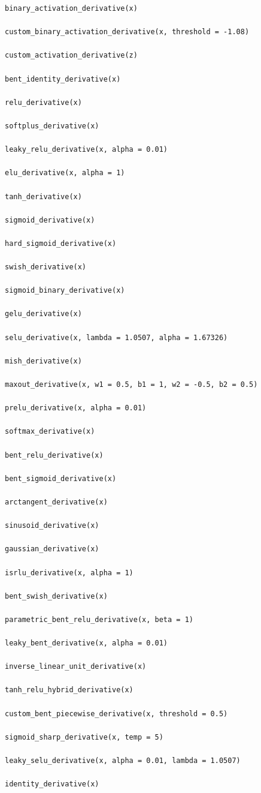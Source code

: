 \documentclass[a4paper]{book}
\begin{document}
%
\begin{Usage}
\begin{verbatim}
binary_activation_derivative(x)

custom_binary_activation_derivative(x, threshold = -1.08)

custom_activation_derivative(z)

bent_identity_derivative(x)

relu_derivative(x)

softplus_derivative(x)

leaky_relu_derivative(x, alpha = 0.01)

elu_derivative(x, alpha = 1)

tanh_derivative(x)

sigmoid_derivative(x)

hard_sigmoid_derivative(x)

swish_derivative(x)

sigmoid_binary_derivative(x)

gelu_derivative(x)

selu_derivative(x, lambda = 1.0507, alpha = 1.67326)

mish_derivative(x)

maxout_derivative(x, w1 = 0.5, b1 = 1, w2 = -0.5, b2 = 0.5)

prelu_derivative(x, alpha = 0.01)

softmax_derivative(x)

bent_relu_derivative(x)

bent_sigmoid_derivative(x)

arctangent_derivative(x)

sinusoid_derivative(x)

gaussian_derivative(x)

isrlu_derivative(x, alpha = 1)

bent_swish_derivative(x)

parametric_bent_relu_derivative(x, beta = 1)

leaky_bent_derivative(x, alpha = 0.01)

inverse_linear_unit_derivative(x)

tanh_relu_hybrid_derivative(x)

custom_bent_piecewise_derivative(x, threshold = 0.5)

sigmoid_sharp_derivative(x, temp = 5)

leaky_selu_derivative(x, alpha = 0.01, lambda = 1.0507)

identity_derivative(x)
\end{verbatim}
\end{Usage}
\end{document}
